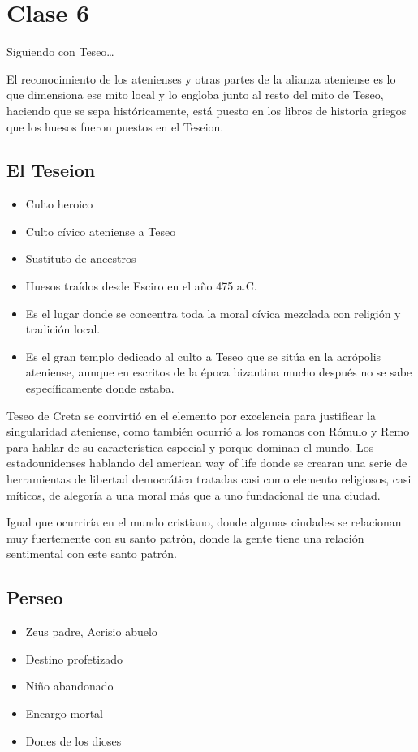 \chapter{Clase 6}\label{ch:clase6}
Siguiendo con Teseo\dots

El reconocimiento de los atenienses y otras partes de la alianza ateniense es lo que dimensiona ese mito local y lo engloba junto al resto del mito de Teseo, haciendo que se sepa históricamente, está puesto en los libros de historia griegos que los huesos fueron puestos en el Teseion.

\section{El Teseion}
\begin{itemize}
	\item Culto heroico
	\item Culto cívico ateniense a Teseo
	\item Sustituto de ancestros
	\item Huesos traídos desde Esciro en el año 475 a.C.
	\item Es el lugar donde se concentra toda la moral cívica mezclada con religión y tradición local.
	\item Es el gran templo dedicado al culto a Teseo que se sitúa en la acrópolis ateniense, aunque en escritos de la época bizantina mucho después no se sabe específicamente donde estaba.
\end{itemize}

Teseo de Creta se convirtió en el elemento por excelencia para justificar la singularidad ateniense, como también ocurrió a los romanos con Rómulo y Remo para hablar de su característica especial y porque dominan el mundo. Los estadounidenses hablando del american way of life donde se crearan una serie de herramientas de libertad democrática tratadas casi como elemento religiosos, casi míticos, de alegoría a una moral más que a uno fundacional de una ciudad.

Igual que ocurriría en el mundo cristiano, donde algunas ciudades se relacionan muy fuertemente con su santo patrón, donde la gente tiene una relación sentimental con este santo patrón.

\section{Perseo}
\begin{itemize}
	\item Zeus padre, Acrisio abuelo
	\item Destino profetizado
	\item Niño abandonado
	\item Encargo mortal
	\item Dones de los dioses
\end{itemize}

